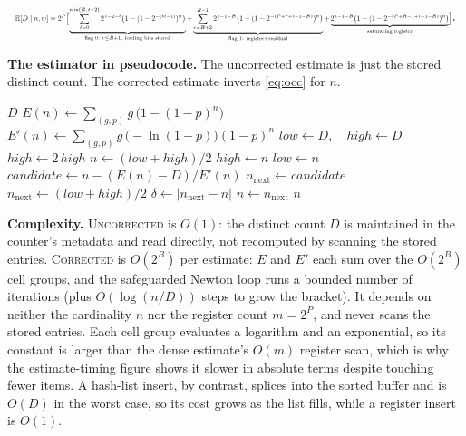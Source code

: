 \begin{equation}\label{eq:wide}
\resizebox{\linewidth}{!}{$\displaystyle
\mathbb{E}[D\mid n,w]
=2^{P}\Bigl[
\underbrace{\sum_{\ell=0}^{\min(B,\,t-2)} 2^{\,t-2-\ell}\bigl(1-(1-2^{-(w-1)})^{n}\bigr)}_{\text{flag }0:\ r\le B+1,\ \text{leading bits stored}}
+
\underbrace{\sum_{r=B+2}^{R-1} 2^{\,t-1-B}\bigl(1-(1-2^{-(P+r+t-1-B)})^{n}\bigr)}_{\text{flag }1:\ \text{register}+\text{residual}}
+
\underbrace{2^{\,t-1-B}\bigl(1-(1-2^{-(P+R-1+t-1-B)})^{n}\bigr)}_{\text{saturating register}}
\Bigr]$}.
\end{equation}

\medskip
\noindent\textbf{The estimator in pseudocode.} The uncorrected estimate is just the stored distinct count. The corrected estimate inverts \eqref{eq:occ} for $n$.
\begin{algorithmic}[1]
  \State \Return $D$ 
\EndFunction
\Statex
{} 
  \State $E(n) \gets \sum_{(g,p)} g\,\bigl(1-(1-p)^{n}\bigr)$ 
  \State $E'(n) \gets \sum_{(g,p)} g\,\bigl(-\ln(1-p)\bigr)(1-p)^{n}$
  \State $low \gets D,\quad high \gets D$
   
    \State $high \gets 2\,high$
  \EndWhile
  \State $n \gets (low+high)/2$
  \Repeat
      \State $high \gets n$
    \Else
      \State $low \gets n$
    \EndIf
    \State $candidate \gets n - (E(n)-D)/E'(n)$ 
      \State $n_{\mathrm{next}} \gets candidate$
    \Else
      \State $n_{\mathrm{next}} \gets (low+high)/2$ 
    \EndIf
    \State $\delta \gets \lvert n_{\mathrm{next}} - n\rvert$
    \State $n \gets n_{\mathrm{next}}$
   
  \State \Return $n$
\EndFunction
\end{algorithmic}

\medskip
\noindent\textbf{Complexity.} \textsc{Uncorrected} is $O(1)$: the distinct count $D$ is maintained in the counter's metadata and read directly, not recomputed by scanning the stored entries. \textsc{Corrected} is $O(2^{B})$ per estimate: $E$ and $E'$ each sum over the $O(2^{B})$ cell groups, and the safeguarded Newton loop runs a bounded number of iterations (plus $O(\log(n/D))$ steps to grow the bracket). It depends on neither the cardinality $n$ nor the register count $m=2^{P}$, and never scans the stored entries. Each cell group evaluates a logarithm and an exponential, so its constant is larger than the dense estimate's $O(m)$ register scan, which is why the estimate-timing figure shows it slower in absolute terms despite touching fewer items. A hash-list insert, by contrast, splices into the sorted buffer and is $O(D)$ in the worst case, so its cost grows as the list fills, while a register insert is $O(1)$.

